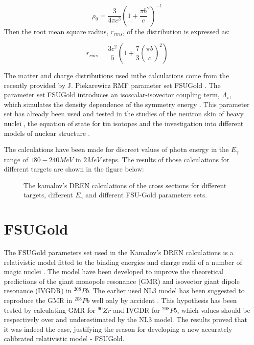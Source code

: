 \begin{equation}
\rho_{0}=\frac{3}{4\pi c^{3}}\left(1+\frac{\pi b}{c}^{2}\right)^{-1}
\end{equation}
Then the root mean square radius, $r_{rms}$, of the distribution is expressed as:

\begin{equation}
r_{rms}=\frac{3c^{2}}{5}\left(1+\frac{7}{3}\left(\frac{\pi b}{c}\right)^{2}\right)
\end{equation}

\indent The matter and charge distributions used inthe calculations come from the recently provided by J. Piekarewicz RMF parameter set FSUGold \cite{piek2}. The parameter set FSUGold introduces an isoscalar-isovector coupling term, $\Lambda_{v}$, which simulates the density dependence of the symmetry energy \cite{sheng}. This parameter set has already been used and tested in the studies of the neutron skin of heavy nuclei \cite{piek3}, the equation of state for tin isotopes \cite{piek4} and the investigation into different models of nuclear structure \cite{piek5}.

\indent The calculations have been made for discreet values of photn energy in the $E_{\gamma}$ range of $180-240 MeV$ in $2 MeV$ steps. The results of those calculations for different targets are shown in the figure below:

\begin{figure}[H]
\begin{center}
\caption{The kamalov's DREN calculations of the cross sections for different targets, different $E_{\gamma}$ and different FSU-Gold parameters sets.}
\label{kamalov_tg}
\end{center}
\end{figure}


\section{FSUGold}

\indent The FSUGold parameters set used in the Kamalov's DREN calculations is a relativistic model fitted to the binding energies and charge radii of a number of magic nuclei \cite{todd}. The model have been developed to improve the theoretical predictions of the giant monopole resonance (GMR) and isovector giant dipole resonance (IVGDR) in $^{208}Pb$. The earlier used NL3 model \cite{lalazissis} has been suggested to reproduce the GMR in $^{208}Pb$ well only by accident \cite{piek6, piek7}. This hypothesis has been tested by calculating GMR for $^{90}Zr$ and IVGDR for $^{208}Pb$, which values should be respectively over and underestimated by the NL3 model. The results proved that it was indeed the case, justifying the reason for developing a new accurately calibrated relativistic model - FSUGold.

